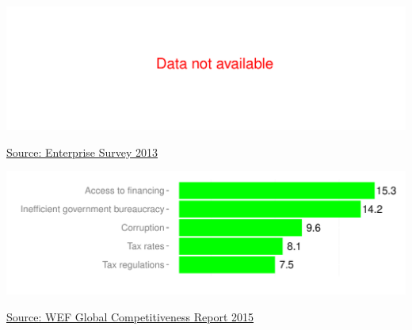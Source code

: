 \documentclass{article}\usepackage[]{graphicx}\usepackage[]{color}
\makeatletter
\def\maxwidth{ %
  \ifdim\Gin@nat@width>\linewidth
    \linewidth
  \else
    \Gin@nat@width
  \fi
}
\makeatother
\begin{document}
\begin{minipage}[b]{0.99\textwidth}
  \begin{minipage}[b]{0.99\textwidth} 
    \vspace{+4ex}
    \begin{minipage}[c]{0.49\textwidth} %


{\centering \includegraphics[width=\maxwidth]{figure/top5constraintsES-1} 

}



      \hspace*{0.3cm} \raggedright\footnotesize{\href{https://www.enterprisesurveys.org/data}{Source: Enterprise Survey 2013}}
    \end{minipage}
    \begin{minipage}[c]{0.49\textwidth} %


{\centering \includegraphics[width=\maxwidth]{figure/top5constraintsWEF-1} 

}



    \hspace*{0.3cm} \raggedright\footnotesize{\href{http://www.weforum.org/reports/global-competitiveness-report-2015-2016}{Source: WEF Global Competitiveness Report 2015}}
    \end{minipage}
  \end{minipage}
\end{minipage}
\end{document}
